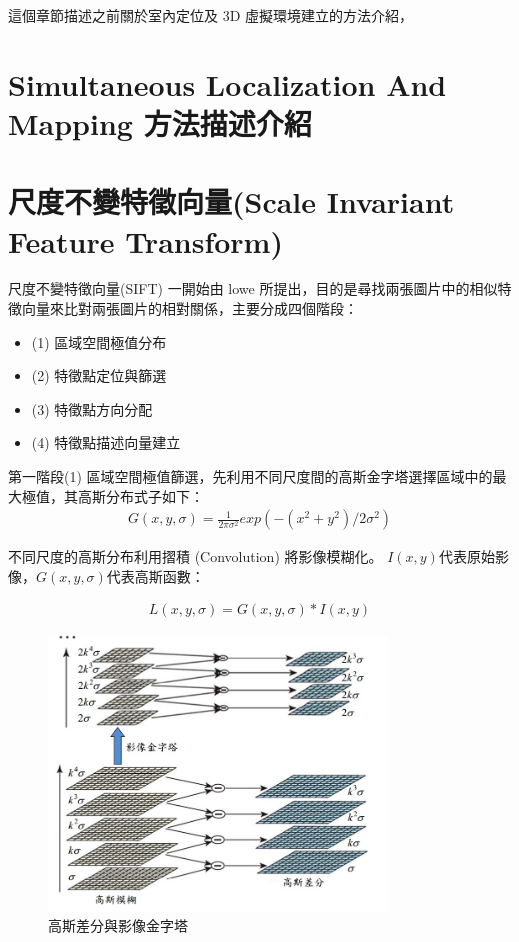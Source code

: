   
  這個章節描述之前關於室內定位及 3D 虛擬環境建立的方法介紹，

\section{Simultaneous Localization And Mapping 方法描述介紹}

\section{尺度不變特徵向量(Scale Invariant Feature Transform)}

	尺度不變特徵向量(SIFT) 一開始由 lowe \cite{Lowe2004} 所提出，目的是尋找兩張圖片中的相似特徵向量來比對兩張圖片的相對關係，主要分成四個階段：
\begin{itemize}
	\item (1) 區域空間極值分布
  \item (2) 特徵點定位與篩選
  \item (3) 特徵點方向分配
  \item (4) 特徵點描述向量建立
\end{itemize}

   第一階段(1) 區域空間極值篩選，先利用不同尺度間的高斯金字塔選擇區域中的最大極值，其高斯分布式子如下：
\begin{align}
  G(x,y,\sigma) = \frac{1}{2\pi\sigma^2}exp(-(x^2+y^2)/2\sigma^2) 
\end{align}

	不同尺度的高斯分布利用摺積 (Convolution) 將影像模糊化。 $I(x,y)$代表原始影像，$G(x,y,\sigma)$代表高斯函數：
	
\begin{align}
  L(x,y,\sigma) = G(x,y,\sigma)\ast{I(x,y)}
\end{align}

\begin{figure}
\begin{center}
  \includegraphics[width=0.8\textwidth]{figures/Gaussian_Prymaid.jpg}
  \caption{高斯差分與影像金字塔}
  \label{fig:Gaussian Prymaid}
\end{center}
\end{figure}  

